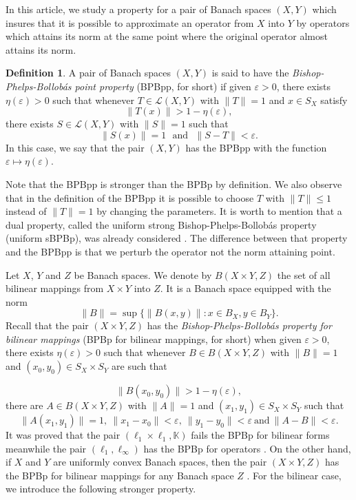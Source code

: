 \documentclass[12pt,a4paper]{amsart}
\theoremstyle{definition}
\newtheorem{definition}[theorem]{Definition}
\newcommand{\e}{\varepsilon}
\numberwithin{equation}{section}
\newcommand{\K}{\mathbb{K}} %
\def\K{{\mathbb K}}
\begin{document}
In this article, we study a property for a pair of Banach spaces $(X,Y)$ which insures that it is possible to approximate an operator from $X$ into $Y$ by operators which attains its norm at the same point where the original operator almost attains its norm.
\begin{definition}  A pair of Banach spaces $(X, Y)$ is said to have the {\it Bishop-Phelps-Bollob\'as point property} (BPBpp, for short) if given $\e > 0$, there exists $\eta(\e) > 0$ such that whenever $T \in \mathcal{L}(X, Y)$ with $\|T\| = 1$ and $x \in S_X$ satisfy
\begin{equation*}
\|T(x)\| > 1 - \eta(\e),
\end{equation*}
there exists $S \in \mathcal{L}(X, Y)$ with $\|S\| = 1$ such that
\begin{equation*}
\|S(x)\| = 1 \ \ \ \mbox{and} \ \ \ \|S - T\| < \e.
\end{equation*}
In this case, we say that the pair $(X, Y)$ has the BPBpp with the function $\e \longmapsto \eta(\e)$.
\end{definition}

Note that the BPBpp is stronger than the BPBp by definition. We also observe that in the definition of the BPBpp it is possible to choose $T$ with $\|T\| \leq 1$ instead of $\|T\| = 1$ by changing the parameters. It is worth to mention that a dual property, called the uniform strong Bishop-Phelps-Bollob\'as property (uniform sBPBp),  was already considered \cite{Dantas}.  The difference between that property and the BPBpp is that we perturb the operator not the norm attaining point. 




Let $X$, $Y$ and $Z$ be Banach spaces. We denote by $B(X \times Y, Z)$ the set of all bilinear mappings from $X \times Y$ into $Z$. It is a Banach space equipped with the norm
\[ \|B\| = \sup \{ \|B(x, y)\| : x\in B_X, y\in B_Y\}. \]
Recall that the pair $(X \times Y, Z)$ has the {\it Bishop-Phelps-Bollob\'as property for bilinear mappings} (BPBp for bilinear mappings, for short) when given $\e > 0$, there exists $\eta(\e) > 0$ such that whenever $B \in B(X \times Y, Z)$ with $\|B\| = 1$ and $(x_0, y_0) \in S_X \times S_Y$ are such that

\begin{equation*}
\|B(x_0, y_0)\| > 1 - \eta(\e),
\end{equation*}
there are $A \in B(X \times Y, Z)$ with $\|A\| = 1$ and $(x_1, y_1) \in S_X \times S_Y$ such that
\begin{equation*}
\|A(x_1, y_1)\| = 1, \ \|x_1 - x_0\| < \e, \ \|y_1 - y_0\| <\e \ \mbox{and} \ \|A - B\| < \e.
\end{equation*}
It was proved that the pair $(\ell_1 \times \ell_1, \K)$ fails the BPBp for bilinear forms \cite[Theorem 2]{CS} meanwhile the pair $(\ell_1, \ell_{\infty})$ has the BPBp for operators \cite[Theorem 4.1]{AAGM}. On the other hand, if $X$ and $Y$ are uniformly convex Banach spaces, then the pair $(X \times Y, Z)$ has the BPBp for bilinear mappings for any Banach space $Z$ \cite[Theorem 2.2]{ABGM}. For the bilinear case, we introduce the following stronger property.
\end{document}
